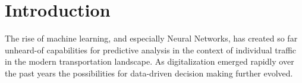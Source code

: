 %
%
% 
% 
% 

\chapter{Introduction}
\label{chap:introduction}
The rise of machine learning, and especially Neural Networks, has created so far unheard-of capabilities for predictive analysis in the context of individual traffic in the modern transportation landscape. As digitalization emerged rapidly over the past years the possibilities for data-driven decision making further evolved.
